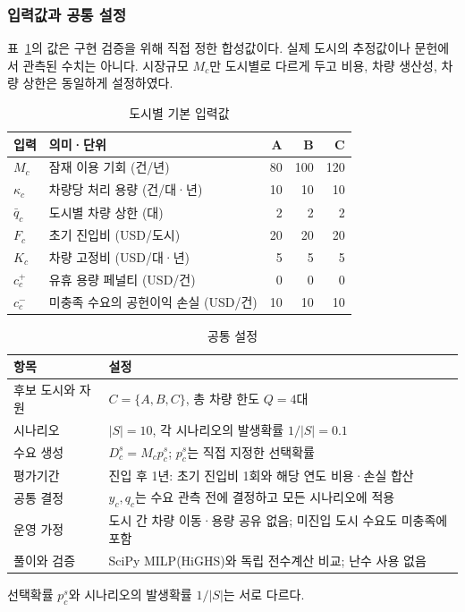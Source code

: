 \documentclass[10pt,a4paper]{article}
\begin{document}
\subsubsection{입력값과 공통 설정}
표~\ref{tab:sc-input}의 값은 구현 검증을 위해 직접 정한 합성값이다.
실제 도시의 추정값이나 문헌에서 관측된 수치는 아니다.
시장규모 $M_c$만 도시별로 다르게 두고 비용, 차량 생산성, 차량 상한은 동일하게 설정하였다.
\begin{table}[H]
\centering\small
\caption{도시별 기본 입력값}\label{tab:sc-input}
\begin{tabular}{llrrr}
\toprule
입력 & 의미·단위 & A & B & C\\\midrule
$M_c$ & 잠재 이용 기회 (건/년) & 80 & 100 & 120\\
$\kappa_c$ & 차량당 처리 용량 (건/대·년) & 10 & 10 & 10\\
$\bar q_c$ & 도시별 차량 상한 (대) & 2 & 2 & 2\\
$F_c$ & 초기 진입비 (USD/도시) & 20 & 20 & 20\\
$K_c$ & 차량 고정비 (USD/대·년) & 5 & 5 & 5\\
$c_c^+$ & 유휴 용량 페널티 (USD/건) & 0 & 0 & 0\\
$c_c^-$ & 미충족 수요의 공헌이익 손실 (USD/건) & 10 & 10 & 10\\
\bottomrule
\end{tabular}
\end{table}
\begin{table}[H]
\centering\small
\caption{공통 설정}\label{tab:sc-common}
\begin{tabular}{P{.19\linewidth}P{.72\linewidth}}
\toprule
항목 & 설정\\\midrule
후보 도시와 자원 & $C=\{A,B,C\}$, 총 차량 한도 $Q=4$대\\
시나리오 & $|S|=10$, 각 시나리오의 발생확률 $1/|S|=0.1$\\
수요 생성 & $D_c^s=M_cp_c^s$; $p_c^s$는 직접 지정한 선택확률\\
평가기간 & 진입 후 1년: 초기 진입비 1회와 해당 연도 비용·손실 합산\\
공통 결정 & $y_c,q_c$는 수요 관측 전에 결정하고 모든 시나리오에 적용\\
운영 가정 & 도시 간 차량 이동·용량 공유 없음; 미진입 도시 수요도 미충족에 포함\\
풀이와 검증 & SciPy MILP(HiGHS)와 독립 전수계산 비교; 난수 사용 없음\\
\bottomrule
\end{tabular}
\end{table}
선택확률 $p_c^s$와 시나리오의 발생확률 $1/|S|$는 서로 다르다.
\end{document}
